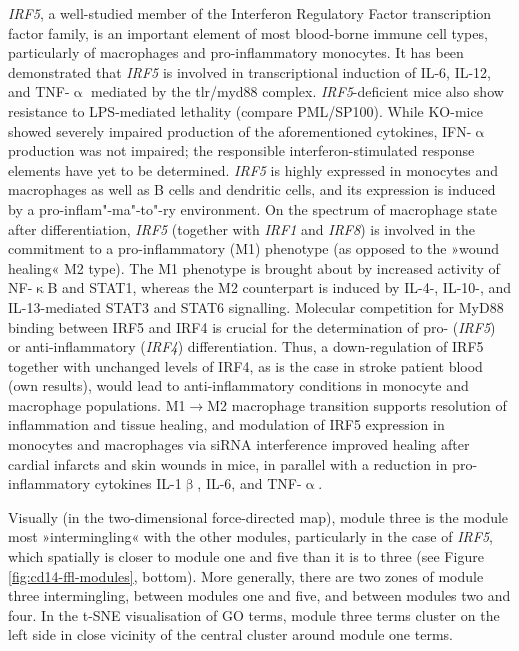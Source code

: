 \emph{IRF5}, a well-studied member of the Interferon Regulatory Factor transcription factor family, is an important element of most blood-borne immune cell types, particularly of macrophages and pro-inflammatory monocytes.\cite{Li2016} It has been demonstrated that \emph{IRF5} is involved in transcriptional induction of IL-6, IL-12, and TNF-$\upalpha$ mediated by the \acf{tlr}/\ac{myd88} complex. \emph{IRF5}-deficient mice also show resistance to LPS-mediated lethality (compare PML/SP100).\cite{Takaoka2005} While KO-mice showed severely impaired production of the aforementioned cytokines, IFN-$\upalpha$ production was not impaired; the responsible interferon-stimulated response elements have yet to be determined.\cite{Takaoka2005} \emph{IRF5} is highly expressed in monocytes and macrophages as well as B cells and dendritic cells, and its expression is induced by a pro-inflam"-ma"-to"-ry environment.\cite{Krausgruber2011} On the spectrum of macrophage state after differentiation, \emph{IRF5} (together with \emph{IRF1} and \emph{IRF8}) is involved in the commitment to a pro-inflammatory (M1) phenotype (as opposed to the »wound healing« M2 type).\cite{Chistiakov2018}  The M1 phenotype is brought about by increased activity of NF-$\upkappa$B and STAT1, whereas the M2 counterpart is induced by IL-4-, IL-10-, and IL-13-mediated STAT3 and STAT6 signalling.\cite{Wang2014a} Molecular competition for MyD88 binding between IRF5 and IRF4 is crucial for the determination of pro- (\emph{IRF5}) or anti-inflammatory (\emph{IRF4}) differentiation.\cite{Negishi2006} Thus, a down-regulation of IRF5 together with unchanged levels of IRF4, as is the case in stroke patient blood (own results), would lead to anti-inflammatory conditions in monocyte and macrophage populations. M1$\to$M2 macrophage transition supports resolution of inflammation and tissue healing, and modulation of IRF5 expression in monocytes and macrophages via siRNA interference improved healing after cardial infarcts and skin wounds in mice, in parallel with a reduction in pro-inflammatory cytokines IL-1$\upbeta$, IL-6, and TNF-$\upalpha$.\cite{Courties2014}

Visually (in the two-dimensional force-directed map), module three is the module most »intermingling« with the other modules, particularly in the case of \emph{IRF5}, which spatially is closer to module one and five than it is to three (see Figure \ref{fig:cd14-ffl-modules}, bottom). More generally, there are two zones of module three intermingling, between modules one and five, and between modules two and four. In the t-SNE visualisation of GO terms, module three terms cluster on the left side in close vicinity of the central cluster around module one terms.

